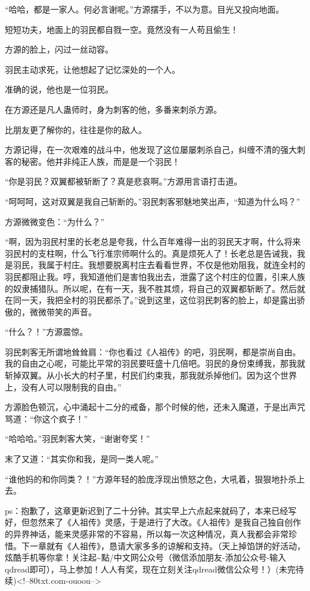 \begin{this_body}
“哈哈，都是一家人。何必言谢呢。”方源摆手，不以为意。目光又投向地面。

短短功夫，地面上的羽民都自戮一空。竟然没有一人苟且偷生！

方源的脸上，闪过一丝动容。

羽民主动求死，让他想起了记忆深处的一个人。

准确的说，他也是一位羽民。

在方源还是凡人蛊师时，身为刺客的他，多番来刺杀方源。

比朋友更了解你的，往往是你的敌人。

方源记得，在一次艰难的战斗中，他发现了这位屡屡刺杀自己，纠缠不清的强大刺客的秘密。他并非纯正人族，而是是一个羽民！

“你是羽民？双翼都被斩断了？真是悲哀啊。”方源用言语打击道。

“呵呵呵，这对双翼是我自己斩断的。”羽民刺客邪魅地笑出声，“知道为什么吗？”

方源微微变色：“为什么？”

“啊，因为羽民村里的长老总是夸我，什么百年难得一出的羽民天才啊，什么将来羽民村的支柱啊，什么飞行准宗师啊什么的。真是烦死人了！长老总是告诫我，我是羽民，我属于村庄。我想要脱离村庄去看看世界，不仅是他劝阻我，就连全村的羽民都阻止我。哼，我知道他们是害怕我出去，泄露了这个村庄的位置，引来人族的奴隶捕猎队。所以呢，在有一天，我不胜其烦，将自己的双翼都斩断了。然后就在同一天，我把全村的羽民都杀了。”说到这里，这位羽民刺客的脸上，却是露出骄傲的，微微带笑的声音。

“什么？！”方源震惊。

羽民刺客无所谓地耸耸肩：“你也看过《人祖传》的吧，羽民啊，都是崇尚自由。我的自由之心呢，可能比平常的羽民要旺盛十几倍吧。羽民的身份束缚我，那我就斩掉双翼。从小长大的村子里，村民们约束我，那我就杀掉他们。因为这个世界上，没有人可以限制我的自由。”

方源脸色顿沉，心中涌起十二分的戒备，那个时候的他，还未入魔道，于是出声咒骂道：“你这个疯子！”

“哈哈哈。”羽民刺客大笑，“谢谢夸奖！”

末了又道：“其实你和我，是同一类人呢。”

“谁他妈的和你同类？！”方源年轻的脸庞浮现出愤怒之色，大吼着，狠狠地扑杀上去。

ps：抱歉了，这章更新迟到了二十分钟。其实早上六点起来就码了，本来已经写好，但忽然来了《人祖传》灵感，于是进行了大改。《人祖传》是我自己独自创作的异界神话，能来灵感非常的不容易，所以每一次这种情况，真人我都会非常珍惜。下一章就有《人祖传》，恳请大家多多的谅解和支持。（天上掉馅饼的好活动，炫酷手机等你拿！关注起\~{}點/中文网公众号（微信添加朋友-添加公众号-输入qdread即可），马上参加！人人有奖，现在立刻关注qdread微信公众号！）(未完待续)<!--80txt.com-ouoou-->

\end{this_body}

